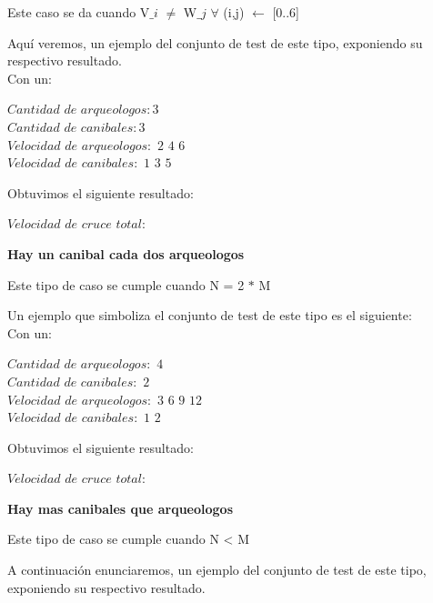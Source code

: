 Este caso se da cuando V${\_i}$ $\neq$ W${\_j}$ $\forall$ (i,j)  $\gets$ [0..6] 

Aqu\'i veremos, un ejemplo del conjunto de test de este tipo, exponiendo su respectivo resultado.\\

 Con un:
 \begin{flushleft} 
  	$Cantidad$ $de$ $arqueologos: 3 $  \\
	$Cantidad$ $de$ $canibales: 3 $  \\
	$Velocidad$ $de$ $arqueologos:$ $2$ $4$ $6 $  \\
	$Velocidad$ $de$ $canibales:$ $1$ $3$ $5 $  \\
\end{flushleft}
  Obtuvimos el siguiente resultado:
   \begin{flushleft}   
$Velocidad$ $de$ $cruce$ $total: $\\
\end{flushleft}

\begin{center}
 \textbf{Hay un canibal cada dos arqueologos}
\end{center}

Este tipo de caso se cumple cuando N = 2 $\ast$ M

Un ejemplo que simboliza el conjunto de test de este tipo es el siguiente:\\

 Con un:
 \begin{flushleft} 
  	$Cantidad$ $de$ $arqueologos:$ $4 $  \\
	$Cantidad$ $de$ $canibales:$ $2$ \\ 
	$Velocidad$ $de$ $arqueologos:$ $3$ $6$ $9$ $12$\\
	$Velocidad$ $de$ $canibales:$ $1$ $2$  \\
\end{flushleft}
  Obtuvimos el siguiente resultado:
   \begin{flushleft}   
$Velocidad$ $de$ $cruce$ $total: $\\
\end{flushleft}


\begin{center}
 \textbf{Hay mas canibales que arqueologos}
\end{center}

Este tipo de caso se cumple cuando N < M

A continuaci\'on enunciaremos, un ejemplo del conjunto de test de este tipo, exponiendo su respectivo resultado.\\

